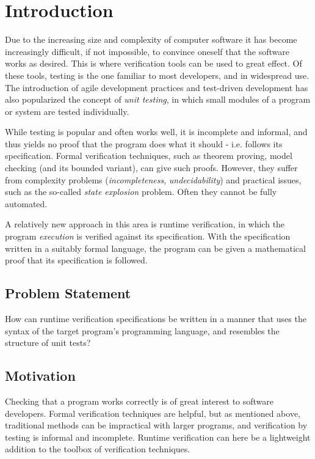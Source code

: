 \documentclass[a4paper,11pt]{kth-mag}
\begin{document}
\pagestyle{newchap}
\chapter{Introduction} \label{chapter-introduction}

Due to the increasing size and complexity of computer software it has become
increasingly difficult, if not impossible, to convince oneself that the
software works as desired. This is where verification tools can be used to
great effect. Of these tools, testing is the one familiar to most developers,
and in widespread use. The introduction of agile development practices and
test-driven development has also popularized the concept of \textit{unit
testing}, in which small modules of a program or system are tested
individually.

While testing is popular and often works well, it is incomplete and informal,
and thus yields no proof that the program does what it should - i.e. follows
its specification. Formal verification techniques, such as theorem proving,
model checking (and its bounded variant), can give such proofs. However, they
suffer from complexity problems (\textit{incompleteness},
\textit{undecidability}) and practical issues, such as the so-called
\textit{state explosion} problem. Often they cannot be fully automated.

A relatively new approach in this area is runtime verification, in which the
program \textit{execution} is verified against its specification. With the
specification written in a suitably formal language, the program can be given a
mathematical proof that its specification is followed.


\section{Problem Statement} \label{section-problem-statement}

How can runtime verification specifications be written in a manner that uses
the syntax of the target program's programming language, and resembles
the structure of unit tests?


\section{Motivation}

Checking that a program works correctly is of great interest to software
developers. Formal verification techniques are helpful, but as mentioned above,
traditional methods can be impractical with larger programs, and verification
by testing is informal and incomplete. Runtime verification can here be a
lightweight addition to the toolbox of verification techniques.
\end{document}
